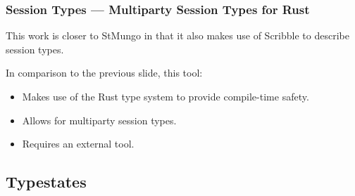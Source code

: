 \documentclass[bigger,notes]{beamer}
\begin{document}
\begin{frame}
    \frametitle{Session Types --- Multiparty Session Types for Rust}
    This work is closer to StMungo in that it also makes use of Scribble to describe session types.

    In comparison to the previous slide, this tool:
    \begin{itemize}
        \item Makes use of the Rust type system to provide compile-time safety.
        \item Allows for multiparty session types.
        \item Requires an external tool.
    \end{itemize}

\end{frame}





\subsection{Typestates}
\end{document}
